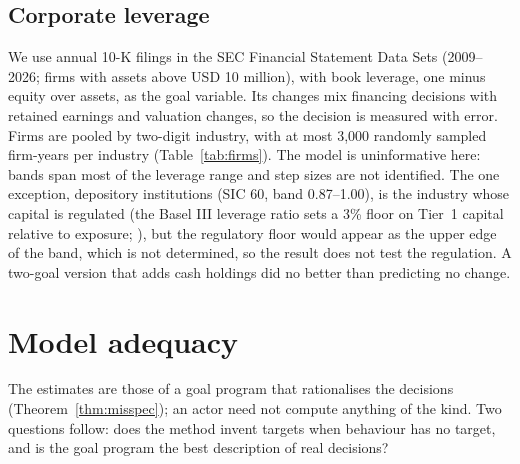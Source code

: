 \documentclass[pdflatex,sn-basic]{sn-jnl}
\theoremstyle{thmstyleone}\newtheorem{proposition}{Proposition}\newtheorem{theorem}{Theorem}
\theoremstyle{thmstylethree}\newtheorem{remark}{Remark}
\begin{document}
\subsection{Corporate leverage}\label{sec:firms}
We use annual 10-K filings in the SEC Financial Statement Data Sets (2009--2026; firms with assets above USD 10 million), with book leverage, one minus equity over assets, as the goal variable. Its changes mix financing decisions with retained earnings and valuation changes, so the decision is measured with error. Firms are pooled by two-digit industry, with at most 3,000 randomly sampled firm-years per industry (Table~\ref{tab:firms}). The model is uninformative here: bands span most of the leverage range and step sizes are not identified. The one exception, depository institutions (SIC 60, band 0.87--1.00), is the industry whose capital is regulated (the Basel III leverage ratio sets a 3\% floor on Tier~1 capital relative to exposure; \citealp{bcbs2014}), but the regulatory floor would appear as the upper edge of the band, which is not determined, so the result does not test the regulation. A two-goal version that adds cash holdings did no better than predicting no change.
\begin{table}[t]\centering\small
\caption{Book leverage, firms pooled by two-digit SIC industry; a dash marks a step that is not identified.}\label{tab:firms}\end{table}


\section{Model adequacy}\label{sec:adequacy}
The estimates are those of a goal program that rationalises the decisions (Theorem~\ref{thm:misspec}); an actor need not compute anything of the kind. Two questions follow: does the method invent targets when behaviour has no target, and is the goal program the best description of real decisions?
\end{document}
